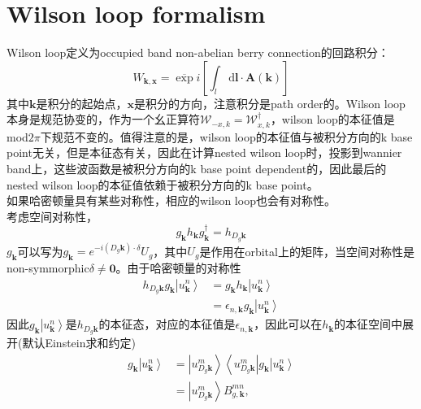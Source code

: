 \documentclass[10pt,openany]{book}
\theoremstyle{thmstyle} %
\theoremstyle{defstyle} %
\theoremstyle{prostyle} %
\begin{document}
\section{Wilson loop formalism}
Wilson loop定义为occupied band non-abelian berry connection的回路积分：
\begin{equation}
  W_{\mathbf{k},\mathbf{x}}=\overline{\exp }i\left[\int_l \mathrm{~d} \mathbf{l} \cdot \mathbf{A}(\mathbf{k})\right]
\end{equation}
其中$ \mathbf{k} $是积分的起始点，$ \mathbf{x} $是积分的方向，注意积分是path order的。Wilson loop本身是规范协变的，作为一个幺正算符$ \mathcal{W}_{-x, k}=\mathcal{W}_{x, k}^{\dagger} $，wilson loop的本征值是mod$ 2\pi $下规范不变的。值得注意的是，wilson loop的本征值与被积分方向的k base point无关，但是本征态有关，因此在计算nested wilson loop时，投影到wannier band上，这些波函数是被积分方向的k base point dependent的，因此最后的nested wilson loop的本征值依赖于被积分方向的k base point。\\
如果哈密顿量具有某些对称性，相应的wilson loop也会有对称性。\\
考虑空间对称性，
\begin{equation*}
  g_{\mathbf{k}} h_{\mathbf{k}} g_{\mathbf{k}}^{\dagger}=h_{D_g \mathbf{k}}
\end{equation*} 
$ g_{\mathbf{k}} $可以写为$ g_{\mathbf{k}}=e^{-i\left(D_g \mathbf{k}\right) \cdot \delta} U_g $，其中$ U_g $是作用在orbital上的矩阵，当空间对称性是non-symmorphic$ \delta\neq\mathbf{0} $。由于哈密顿量的对称性
\begin{equation*}
  \begin{aligned}
    h_{D_g \mathbf{k}} g_{\mathbf{k}}\left|u_{\mathbf{k}}^n\right\rangle & =g_{\mathbf{k}} h_{\mathbf{k}}\left|u_{\mathbf{k}}^n\right\rangle \\
    & =\epsilon_{n, \mathbf{k}} g_{\mathbf{k}}\left|u_{\mathbf{k}}^n\right\rangle
    \end{aligned}
\end{equation*}
因此$ g_{\mathbf{k}}\left|u_{\mathbf{k}}^n\right\rangle $是$ h_{D_g \mathbf{k}} $的本征态，对应的本征值是$ \epsilon_{n, \mathbf{k}} $，因此可以在$ h_{\mathbf{k}} $的本征空间中展开(默认Einstein求和约定)
\begin{equation}
  \begin{aligned}
    g_{\mathbf{k}}\left|u_{\mathbf{k}}^n\right\rangle & =\left|u_{D_g \mathbf{k}}^m\right\rangle\left\langle u_{D_g \mathbf{k}}^m\right| g_{\mathbf{k}}\left|u_{\mathbf{k}}^n\right\rangle \\
    & =\left|u_{D_g \mathbf{k}}^m\right\rangle B_{g, \mathbf{k}}^{m n},
    \end{aligned}
\end{equation}
\end{document}

